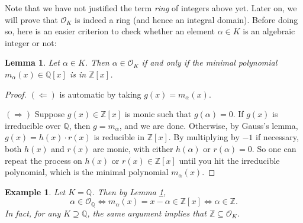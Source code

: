 \documentclass[11pt]{book}
\newtheorem{example}[theorem]{Example}
\newtheorem{lemma}[theorem]{Lemma}
\begin{document}
Note that we have not justified the term {\it ring} of integers above yet. Later on, we will prove that $\mathcal{O}_K$ is indeed a ring (and hence an integral domain). Before doing so, here is an easier criterion to check whether an element $\alpha \in K$ is an algebraic integer or not:
\begin{lemma} \label{lem-okminpoly}
Let $\alpha \in K$. Then $ \alpha \in \mathcal{O}_K $ if and only if the minimal polynomial $ m_\alpha(x) \in \mathbb{Q}[x] $ is in $ \mathbb{Z}[x] $.
\end{lemma}

\begin{proof}
\noindent $ (\Leftarrow) $ is automatic by taking $ g(x) = m_\alpha(x)$.

\noindent $ (\Rightarrow) $ Suppose $ g(x) \in \mathbb{Z}[x] $ is monic such that $ g(\alpha) = 0 $. If $ g(x) $ is irreducible over $ \mathbb{Q} $, then $ g = m_\alpha $, and we are done. Otherwise, by Gauss's lemma, $ g(x) = h(x) \cdot r(x) $ is reducible in $\mathbb{Z}[x]$. By multiplying by $-1$ if necessary, both $ h(x) $ and $ r(x) $ are monic, with either $ h(\alpha) $ or $ r(\alpha) = 0 $. So one can repeat the process on $h(x)$ or $r(x) \in \mathbb{Z}[x]$ until you hit the irreducible polynomial, which is the minimal polynomial $ m_\alpha(x)$.
\end{proof}

\begin{example} \label{eg-OQ=z}
Let $ K = \mathbb{Q} $. Then by Lemma \ref{lem-okminpoly},
$$
\alpha \in \mathcal{O}_\mathbb{Q} \iff m_\alpha(x) = x - \alpha \in \mathbb{Z}[x] \iff \alpha \in \mathbb{Z}.
$$
In fact, for any $ K \supseteq \mathbb{Q} $, the same argument implies that $ \mathbb{Z} \subseteq \mathcal{O}_K $. 
\end{example}
\end{document}
